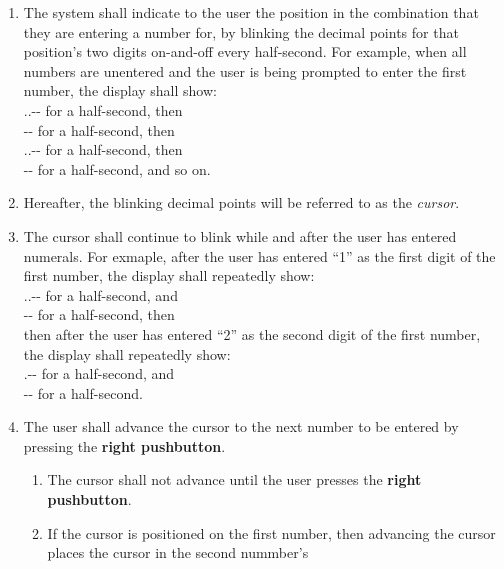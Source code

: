 \begin{enumerate}
\begin{enumerate}
    \item The system shall indicate to the user the position in the combination
        that they are entering a number for, by blinking the decimal points for
        that position's two digits on-and-off every half-second. For example,
        when all numbers are unentered and the user is being prompted to enter
        the first number, the display shall show: \\
        {\dviiseg \phantom{8}.\phantom{8}.-\phantom{88}-\phantom{88}} for a
            half-second, then \\
        {\dviiseg \phantom{88}-\phantom{88}-\phantom{88}} for a half-second,
            then \\
        {\dviiseg \phantom{8}.\phantom{8}.-\phantom{88}-\phantom{88}} for a
            half-second, then \\
        {\dviiseg \phantom{88}-\phantom{88}-\phantom{88}} for a half-second, and
            so on.
    \item Hereafter, the blinking decimal points will be referred to as the
        \textit{cursor}.
    \item The cursor shall continue to blink while and after the user has
        entered numerals. For exmaple, after the user has entered ``1'' as the
        first digit of the first number, the display shall repeatedly show: \\
        {.\phantom{8}.-\phantom{88}-\phantom{88}} for a
            half-second, and \\
        {\phantom{8}-\phantom{88}-\phantom{88}} for a half-second,
            then \\
        then after the user has entered ``2'' as the second digit of the first
        number, the display shall repeatedly show: \\
        {.-\phantom{88}-\phantom{88}} for a
            half-second, and \\
        {-\phantom{88}-\phantom{88}} for a half-second.
    \item The user shall advance the cursor to the next number to be entered by
        pressing the \textbf{right pushbutton}.
        \begin{enumerate}
        \item The cursor shall not advance until the user presses the
            \textbf{right pushbutton}.
        \item If the cursor is positioned on the first number, then
            advancing the cursor places the cursor in the second nummber's

\end{enumerate}
\end{enumerate}
\end{enumerate}
